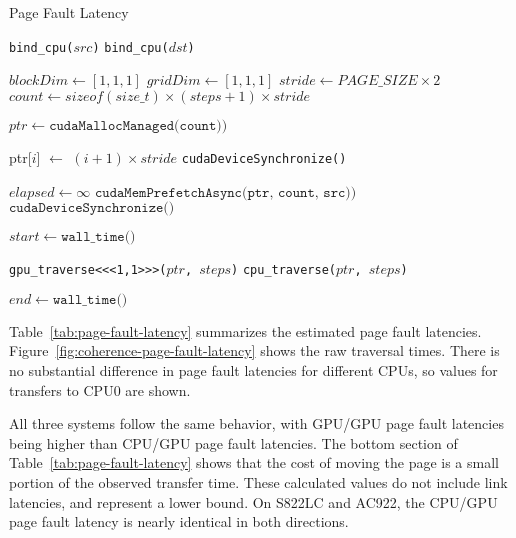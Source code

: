 \begin{algorithm}
	\caption{Page Fault Latency}
	\label{alg:um-latency}
	\begin{algorithmic}[1]
		\Statex
				
            \State \texttt{bind\_cpu($src$)}
        \EndIf
            \State \texttt{bind\_cpu($dst$)}
        \EndIf

        \State $blockDim \gets [1,1,1]$ 
        \State $gridDim \gets [1,1,1]$
        \State $stride \gets PAGE\_SIZE \times 2$
        \State $count \gets sizeof(size\_t) \times (steps + 1) \times stride$

        \State $ptr \gets \texttt{cudaMallocManaged(count))}$

            \State ptr[$i$] $\gets$ $(i+1)\times stride$
        \EndFor
        \State \texttt{cudaDeviceSynchronize()}

        \State $elapsed \gets \infty$
            \State $\texttt{cudaMemPrefetchAsync(ptr, count, src))}$
            \State $\texttt{cudaDeviceSynchronize()}$

            \State $start \gets \texttt{wall\_time()}$

                \State \texttt{gpu\_traverse<<<1,1>>>($ptr$, $steps$)}
            \Else
                \State \texttt{cpu\_traverse($ptr$, $steps$)}
            \EndIf

            \State $end \gets \texttt{wall\_time()}$
        \EndFor

		\EndFunction
				
	\end{algorithmic}
\end{algorithm}

Table~\ref{tab:page-fault-latency} summarizes the estimated page fault latencies.
Figure~\ref{fig:coherence-page-fault-latency} shows the raw traversal times.
There is no substantial difference in page fault latencies for different CPUs, so values for transfers to CPU0 are shown.

All three systems follow the same behavior, with GPU/GPU page fault latencies being higher than CPU/GPU page fault latencies.
The bottom section of Table~\ref{tab:page-fault-latency} shows that the cost of moving the page is a small portion of the observed transfer time.
These calculated values do not include link latencies, and represent a lower bound.
On S822LC and AC922, the CPU/GPU page fault latency is nearly identical in both directions.


